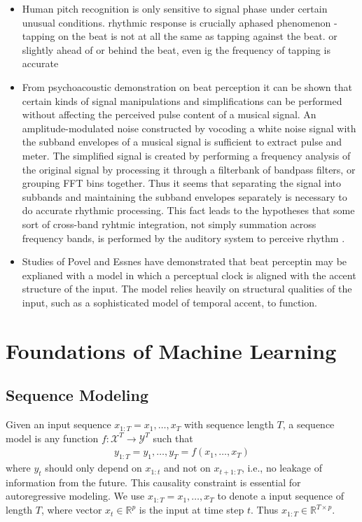 \documentclass{scrartcl}
\begin{document}
\begin{itemize}
\item Human pitch recognition is only sensitive to signal phase under certain unusual conditions. rhythmic response is crucially aphased phenomenon - tapping on the beat is not at all the same as tapping against the beat. or slightly ahead of or behind the beat, even ig the frequency of tapping is accurate \cite{Scheirer1998}
\item From psychoacoustic demonstration on beat perception it can be shown that certain kinds of signal manipulations and simplifications can be performed without affecting the perceived pulse content of a musical signal. An amplitude-modulated noise constructed by vocoding a white noise signal with the subband envelopes of a musical signal is sufficient to extract pulse and meter. The simplified signal is created by performing a frequency analysis of the original signal by processing it through a filterbank of bandpass filters, or grouping FFT bins together. Thus it seems that separating the signal into subbands and maintaining the subband envelopes separately is necessary to do accurate rhythmic processing. This fact leads to the hypotheses that some sort of cross-band ryhtmic integration, not simply summation across frequency bands, is performed by the auditory system to perceive rhythm \cite{Scheirer1998}.
\item Studies of Povel and Essnes \cite{Povel1985} have demonstrated that beat perceptin may be explianed with a model in which a perceptual clock is aligned with the accent structure of the input. The model relies heavily on structural qualities of the input, such as a sophisticated model of temporal accent, to function.
\end{itemize}


\newpage
\section{Foundations of Machine Learning}


\subsection{Sequence Modeling}

Given an input sequence $x_{1:T} = x_1, \dots, x_T$ with sequence length $T$, a sequence model is any function $f: \mathcal X^T \rightarrow \mathcal Y^T$ such that
\begin{align}
y_{1:T} = y_1, \dots, y_T = f(x_1,\dots, x_T)
\end{align}
where $y_t$ should only depend on $x_{1:t}$ and not on $x_{t+1:T}$, i.e., no leakage of information from the future. This causality constraint is essential for autoregressive modeling. We use $x_{1:T} = x_1, \dots, x_T$ to denote a input sequence of length $T$, where vector $x_t \in \mathbb R^p$ is the input at time step $t$. Thus $x_{1:T} \in \mathbb R^{T \times p}$.
\end{document}
